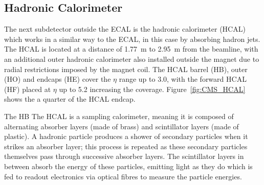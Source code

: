 \subsection{Hadronic Calorimeter}
\label{ss:Hcal}
The next subdetector outside the ECAL is the hadronic calorimeter (HCAL) which works in a similar way to
the ECAL, in this case by absorbing hadron jets. The HCAL is located at a distance of 1.77~m to 2.95~m from
the beamline, with an additional outer hadronic calorimeter also installed outside the magnet due to
radial restrictions imposed by the magnet coil. The HCAL barrel (HB), outer (HO) and endcaps (HE) cover
the $\eta$ range up to 3.0, with the forward HCAL (HF) placed at $\eta$ up to 5.2 increasing the coverage.
Figure~\ref{fig:CMS_HCAL} shows the a quarter of the HCAL endcap.


The HB
The HCAL is a sampling calorimeter, meaning it is composed of alternating absorber layers (made of brass) and
scintillator layers (made of plastic). A hadronic particle produces a shower of secondary particles when it
strikes an absorber layer; this process is repeated as these secondary particles themselves pass through
successive absorber layers. The scintillator layers in between absorb the energy of these particles, emitting
light as they do which is fed to readout electronics via optical fibres to measure the particle energies. 




